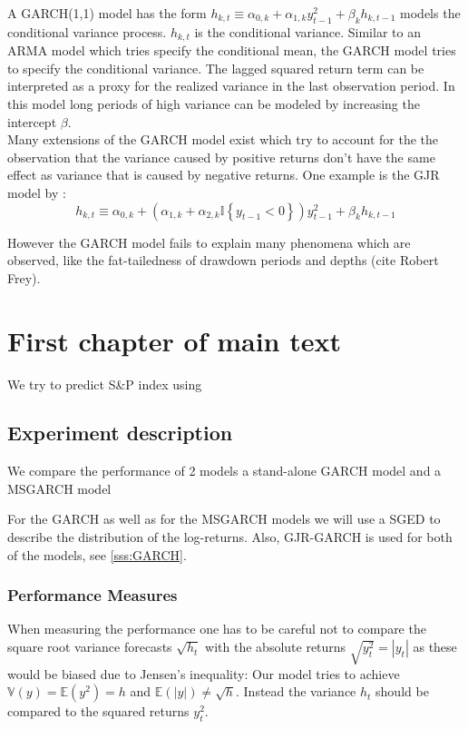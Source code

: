 \documentclass[11pt,a4paper]{article}
\begin{document}
A GARCH(1,1) model has the form $h_{k, t} \equiv \alpha_{0, k}+\alpha_{1, k} y_{t-1}^{2}+\beta_{k} h_{k, t-1}$ models the conditional variance process. $h_{k,t}$ is the conditional variance. Similar to an \ac{ARMA} model which tries specify the conditional mean, the \ac{GARCH} model tries to specify the conditional variance. The lagged squared return term can be interpreted as a proxy for the realized variance in the last observation period. 
In this model long periods of high variance can be modeled by increasing the intercept $\beta$.\\

Many extensions of the GARCH model exist which try to account for the the observation that the variance caused by positive returns don't have the same effect as variance that is caused by negative returns. One example is the GJR model by \cite{glosten_relation_1993}: $$ h_{k, t} \equiv \alpha_{0, k}+\left(\alpha_{1, k}+\alpha_{2, k} \mathbb{I}\left\{y_{t-1}<0\right\}\right) y_{t-1}^2+\beta_k h_{k, t-1}$$

However the GARCH model fails to explain many phenomena which are observed, like the fat-tailedness of drawdown periods and depths (cite Robert Frey).

\section{First chapter of main text}
We try to predict S\&P index using 

\subsection{Experiment description}
We compare the performance of 2 models a stand-alone GARCH model and a MSGARCH model

For the GARCH as well as for the MSGARCH models we will use a \ac{SGED} to describe the distribution of the log-returns.
Also, GJR-GARCH is used for both of the models, see \cref{sss:GARCH}.

\subsubsection{Performance Measures}
When measuring the performance one has to be careful not to compare the square root variance forecasts $\sqrt{h_t}$ with the absolute returns $\sqrt{y_t^2} = | y_t |$ as these would be biased due to Jensen's inequality: Our model tries to achieve $\mathbb{V}(y) =\mathbb{E}(y^2) = h$ and $\mathbb{E}(| y |) \neq \sqrt{h}$. Instead the variance $h_t$ should be compared to the squared returns $y_t^2$.
\end{document}
